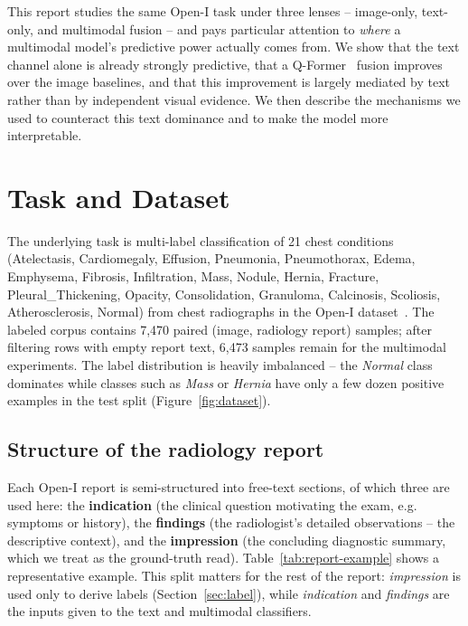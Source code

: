 \documentclass[11pt]{article}
\begin{document}
This report studies the same Open-I task under three lenses -- image-only, text-only,
and multimodal fusion -- and pays particular attention to \emph{where} a multimodal
model's predictive power actually comes from. We show that the text channel alone is
already strongly predictive, that a Q-Former~\cite{blip2} fusion improves over the
image baselines, and that this improvement is largely mediated by text rather than by
independent visual evidence. We then describe the mechanisms we used to counteract
this text dominance and to make the model more interpretable.

\section{Task and Dataset}

The underlying task is multi-label classification of 21 chest conditions
(Atelectasis, Cardiomegaly, Effusion, Pneumonia, Pneumothorax, Edema, Emphysema,
Fibrosis, Infiltration, Mass, Nodule, Hernia, Fracture, Pleural\_Thickening,
Opacity, Consolidation, Granuloma, Calcinosis, Scoliosis, Atherosclerosis, Normal)
from chest radiographs in the Open-I dataset~\cite{openi}. The labeled corpus
contains 7{,}470 paired (image, radiology report) samples; after filtering rows with
empty report text, 6{,}473 samples remain for the multimodal experiments. The label
distribution is heavily imbalanced -- the \emph{Normal} class dominates while classes
such as \emph{Mass} or \emph{Hernia} have only a few dozen positive examples in the
test split (Figure~\ref{fig:dataset}).

\subsection{Structure of the radiology report}

Each Open-I report is semi-structured into free-text sections, of which three are
used here: the \textbf{indication} (the clinical question motivating the exam, e.g.
symptoms or history), the \textbf{findings} (the radiologist's detailed
observations -- the descriptive context), and the \textbf{impression} (the concluding
diagnostic summary, which we treat as the ground-truth read). Table~\ref{tab:report-example}
shows a representative example. This split matters for the rest of the report:
\emph{impression} is used only to derive labels (Section~\ref{sec:label}), while
\emph{indication} and \emph{findings} are the inputs given to the text and multimodal
classifiers.
\end{document}

